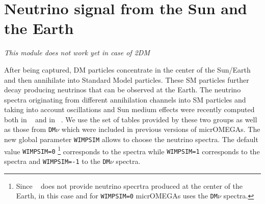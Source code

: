 \documentclass[12pt,a4paper]{article}
\begin{document}


\section{Neutrino signal from the Sun and the Earth }
\label{sec:neutrino}

\begin{center}
{\it This module
does not work yet in case of 2DM}
\end{center}

After being captured, DM particles concentrate in the center of the Sun/Earth and 
then  annihilate into Standard Model particles. These SM particles further decay producing neutrinos that can be 
observed at the Earth.  The neutrino spectra originating from
different annihilation channels into SM particles and
taking into account oscillations  and Sun medium effects were 
recently  computed both in
\wimpsim~\cite{Blennow:2007tw} and in 
\pppc~\cite{Baratella:2013fya}. We use the set of tables
provided by these two groups as well as  those from  {\tt DM$\nu$}
\cite{Cirelli:2005gh}  which were included in previous versions of micrOMEGAs.
The new global parameter {\tt WIMPSIM}  allows to
choose  the   neutrino spectra. The default value  {\tt WIMPSIM=0} \footnote{Since \pppc~ does not provide neutrino specrtra produced at the center of the
Earth, in this case  and for {\tt WIMPSIM=0} micrOMEGAs uses the {\tt DM$\nu$} spectra.}
corresponds to the \pppc spectra while  {\tt WIMPSIM=1} corresponds to the
\wimpsim  spectra and  {\tt WIMPSIM=-1}  to the 
 {\tt DM$\nu$} spectra. 
  
\end{document}
